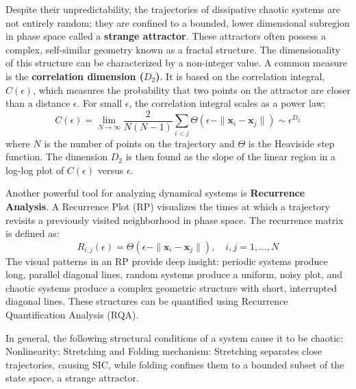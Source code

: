 \documentclass[a4paper,12pt]{article}
\begin{document}
Despite their unpredictability, the trajectories of dissipative chaotic systems are not entirely random; they are confined to a bounded, lower dimensional subregion in phase space called a \textbf{strange attractor}. These attractors often possess a complex, self-similar geometry known as a fractal structure. The dimensionality of this structure can be characterized by a non-integer value. A common measure is the \textbf{correlation dimension ($D_2$)}. It is based on the correlation integral, $C(\epsilon)$, which measures the probability that two points on the attractor are closer than a distance $\epsilon$. For small $\epsilon$, the correlation integral scales as a power law:
\begin{equation}
    C(\epsilon) = \lim_{N \to \infty} \frac{2}{N(N-1)} \sum_{i<j} \Theta(\epsilon - \|\mathbf{x}_i - \mathbf{x}_j\|) \sim \epsilon^{D_2}
\end{equation}
where $N$ is the number of points on the trajectory and $\Theta$ is the Heaviside step function. The dimension $D_2$ is then found as the slope of the linear region in a log-log plot of $C(\epsilon)$ versus $\epsilon$.

Another powerful tool for analyzing dynamical systems is \textbf{Recurrence Analysis}. A Recurrence Plot (RP) visualizes the times at which a trajectory revisits a previously visited neighborhood in phase space. The recurrence matrix is defined as:
\begin{equation}
    R_{i,j}(\epsilon) = \Theta(\epsilon - \|\mathbf{x}_i - \mathbf{x}_j\|), \quad i,j = 1, \dots, N
\end{equation}
The visual patterns in an RP provide deep insight: periodic systems produce long, parallel diagonal lines, random systems produce a uniform, noisy plot, and chaotic systems produce a complex geometric structure with short, interrupted diagonal lines. These structures can be quantified using Recurrence Quantification Analysis (RQA).



In general, the following structural conditions of a system cause it to be chaotic:
Nonlinearity: %
Stretching and Folding mechanism: Stretching separates close trajectories, causing SIC, while folding confines them to a bounded subset of the state space, a strange attractor.
\cite{Hnon1976ATM}
\cite{ROSSLER1976}
\cite{strogatz_textbook}
\end{document}
